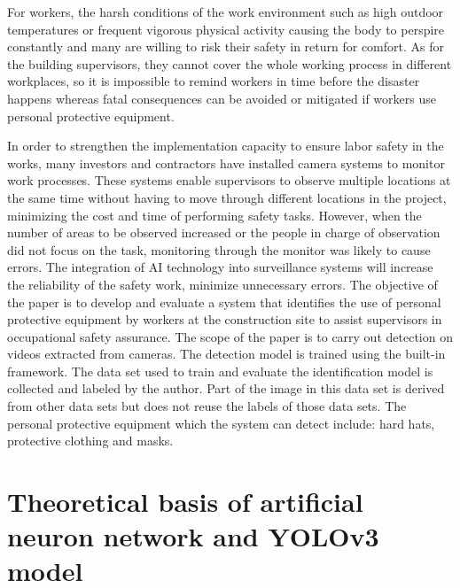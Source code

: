 \documentclass[conference]{IEEEtran}
\begin{document}
For workers, the harsh conditions of the work environment such as high outdoor temperatures or frequent vigorous physical activity causing the body to perspire constantly and many are willing to risk their safety in return for comfort. As for the building supervisors, they cannot cover the whole working process in different workplaces, so it is impossible to remind workers in time before the disaster happens whereas fatal consequences can be avoided or mitigated if workers use personal protective equipment.

In order to strengthen the implementation capacity to ensure labor safety in the works, many investors and contractors have installed camera systems to monitor work processes. These systems enable supervisors to observe multiple locations at the same time without having to move through different locations in the project, minimizing the cost and time of performing safety tasks. However, when the number of areas to be observed increased or the people in charge of observation did not focus on the task, monitoring through the monitor was likely to cause errors. The integration of AI technology into surveillance systems will increase the reliability of the safety work, minimize unnecessary errors. The objective of the paper is to develop and evaluate a system that identifies the use of personal protective equipment by workers at the construction site to assist supervisors in occupational safety assurance. The scope of the paper is to carry out detection on videos extracted from cameras. The detection model is trained using the built-in framework. The data set used to train and evaluate the identification model is collected and labeled by the author. Part of the image in this data set is derived from other data sets but does not reuse the labels of those data sets. The personal protective equipment which the system can detect include: hard hats, protective clothing and masks.

\section{Theoretical basis of artificial neuron network and YOLOv3 model}
\end{document}
